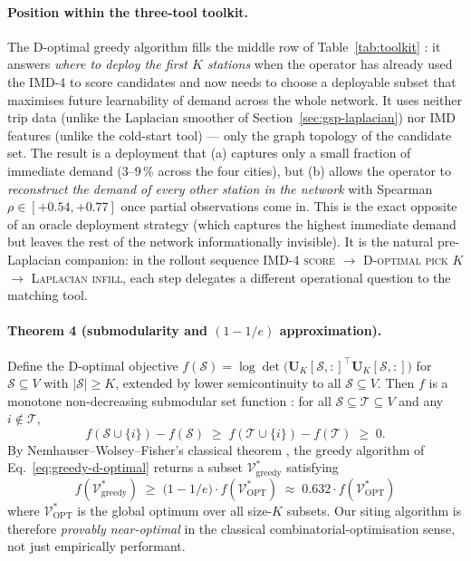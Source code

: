 \paragraph{Position within the three-tool toolkit.}
The D-optimal greedy algorithm fills the middle row of
Table~\ref{tab:toolkit} : it answers \emph{where to deploy the
first $K$ stations} when the operator has already used the
IMD-4 to score candidates and now needs to choose a deployable
subset that maximises future learnability of demand across the
whole network.  It uses neither trip data (unlike the Laplacian
smoother of Section~\ref{sec:gsp-laplacian}) nor IMD features
(unlike the cold-start tool) — only the graph topology of the
candidate set.  The result is a deployment that
(a) captures only a small fraction of immediate demand
($3$--$9\,\%$ across the four cities), but
(b) allows the operator to \emph{reconstruct the demand of every
other station in the network} with Spearman $\rho \in [+0.54,
+0.77]$ once partial observations come in.  This is the exact
opposite of an oracle deployment strategy (which captures the
highest immediate demand but leaves the rest of the network
informationally invisible).  It is the natural pre-Laplacian
companion: in the rollout sequence
\textsc{IMD-4 score} $\to$ \textsc{D-optimal pick $K$} $\to$ \textsc{Laplacian infill},
each step delegates a different operational question to the
matching tool.

\paragraph{Theorem 4 (submodularity and $(1-1/e)$ approximation).}
Define the D-optimal objective
$f(\mathcal{S}) = \log \det\!\bigl(\mathbf{U}_K[\mathcal{S}, :]^\top \mathbf{U}_K[\mathcal{S}, :]\bigr)$
for $\mathcal{S} \subseteq V$ with $|\mathcal{S}| \geq K$, extended
by lower semicontinuity to all $\mathcal{S} \subseteq V$.  Then $f$
is a monotone non-decreasing submodular set function
\citep{Krause2008,AnisGaddeOrtega2016}: for all
$\mathcal{S} \subseteq \mathcal{T} \subseteq V$ and any
$i \notin \mathcal{T}$,
\[
    f(\mathcal{S} \cup \{i\}) - f(\mathcal{S})
    \;\geq\;
    f(\mathcal{T} \cup \{i\}) - f(\mathcal{T}) \;\geq\; 0.
\]
By Nemhauser--Wolsey--Fisher's classical theorem
\citep{Nemhauser1978}, the greedy algorithm of
Eq.~\eqref{eq:greedy-d-optimal} returns a subset
$\mathcal{V}^*_{\mathrm{greedy}}$ satisfying
\begin{equation}
    f(\mathcal{V}^*_{\mathrm{greedy}}) \;\geq\; \bigl( 1 - 1/e \bigr) \cdot f(\mathcal{V}^*_{\mathrm{OPT}})
    \;\approx\; 0.632 \cdot f(\mathcal{V}^*_{\mathrm{OPT}})
    \label{eq:greedy-bound}
\end{equation}
where $\mathcal{V}^*_{\mathrm{OPT}}$ is the global optimum over
all size-$K$ subsets.  Our siting algorithm is therefore
\emph{provably near-optimal} in the classical
combinatorial-optimisation sense, not just empirically
performant.

